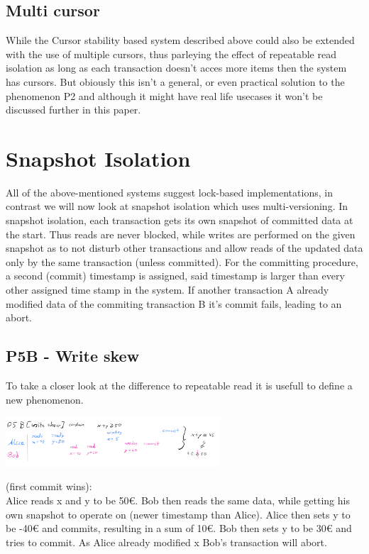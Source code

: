 \documentclass[sigconf, review=true]{acmart}
\begin{document}
\subsection{Multi cursor}
While the Cursor stability based system described above could also be extended with the use of multiple cursors, thus
parleying the effect of repeatable read isolation as long as each transaction doesn't acces more items
then the system has cursors. But obiously this isn't a general, or even practical solution to the phenomenon P2 and
although it might have real life usecases it won't be discussed further in this paper.
\section{Snapshot Isolation}
All of the above-mentioned systems suggest lock-based implementations, in contrast we will now look at
snapshot isolation which uses multi-versioning.
In snapshot isolation, each transaction gets its own snapshot of committed data at the start.
Thus reads are never blocked, while writes are performed on the given snapshot as to not disturb
other transactions and allow reads of the updated data only by the same transaction (unless committed).
For the committing procedure, a second (commit) timestamp is assigned, said timestamp is larger than every
other assigned time stamp in the system. If another transaction A already modified data of the commiting
transaction B it's commit fails, leading to an abort.
\subsection{P5B - Write skew}
To take a closer look at the difference to repeatable read it is usefull to define a new phenomenon.

\includegraphics[width=8cm]{P5}
\begin{example}
    (first commit wins): \\
    Alice reads x and y to be 50€. Bob then reads the same data, while getting his own snapshot
    to operate on (newer timestamp than Alice). Alice then sets y to be -40€ and commits,
    resulting in a sum of 10€. Bob then sets y to be 30€ and tries to commit. As Alice already
    modified x Bob’s transaction will abort.
\end{example}
\end{document}
